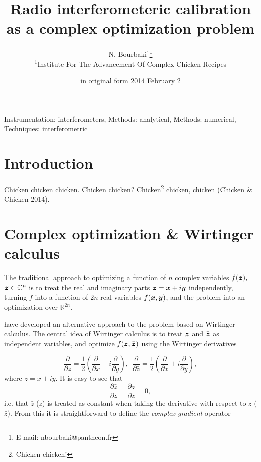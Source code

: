 \documentclass[useAMS,usenatbib]{mn2e}
\title[Radio interferometeric calibration as a complex optimization problem]{Radio interferometeric calibration as a complex optimization problem}
\author[N. Bourbaki]{N. Bourbaki$^1$\thanks{E-mail: nbourbaki@pantheon.fr}\\ 
$^1$Institute For The Advancement Of Complex Chicken Recipes}
\newcommand{\COMPLEX}{\mathbb{C}}
\newcommand{\REAL}{\mathbb{R}}
\newcommand{\zz}{\bmath{z}}
\begin{document}
\date{in original form 2014 February 2}

\pagerange{\pageref{firstpage}--\pageref{lastpage}} 

\maketitle

\label{firstpage}

\begin{abstract}
\end{abstract}

\begin{keywords}
Instrumentation: interferometers, Methods: analytical, Methods: numerical, Techniques: interferometric
\end{keywords}

\section{Introduction}

Chicken chicken chicken. Chicken chicken? Chicken\footnote{Chicken chicken!} chicken, chicken (Chicken \& Chicken 2014).

\section{Complex optimization \& Wirtinger calculus}

The traditional approach to optimizing a function of $n$ complex variables $f(\zz),$ $\zz\in\COMPLEX^n$ is
to treat the real and imaginary parts $\zz=\bmath{x}+i\bmath{y}$ independently, turning $f$ into a function
of $2n$ real variables $f(\bmath{x},\bmath{y})$, and the problem into an optimization over $\REAL^{2n}$.

\citet{ComplexOpt} have developed an alternative approach to the problem based on Wirtinger calculus. The central idea
of Wirtinger calculus is to treat $\zz$ and $\bar{\zz}$ as independent variables, and optimize $f(\zz,\bar{\zz})$
using the Wirtinger derivatives 

\[
\frac{\partial}{\partial z} = \frac{1}{2}\left ( \frac{\partial}{\partial x} - i\frac{\partial}{\partial y} \right),~~
\frac{\partial}{\partial \bar{z}} = \frac{1}{2}\left ( \frac{\partial}{\partial x} + i\frac{\partial}{\partial y} \right),
\]
where $z=x+iy$. It is easy to see that  
\[
\frac{\partial \bar z}{\partial z} = 
\frac{\partial z}{\partial \bar z} = 0,
\]
i.e. that $\bar z$ ($z$) is treated as constant when taking the derivative with respect to $z$ ($\bar z$). From this 
it is straightforward to define the \emph{complex gradient} operator 
\end{document}

